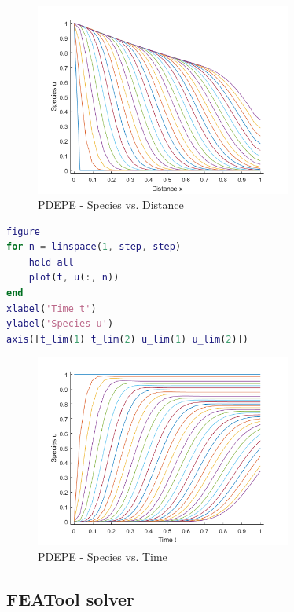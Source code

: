 \documentclass{article}
\begin{document}
\begin{figure}[h!]
\centering
\includegraphics[width=0.75\textwidth]{./img/PDEPE_Species_vs_Distance.png}
\caption{PDEPE - Species vs. Distance}
\label{fig_PDEPE_Species_vs_Distance}
\end{figure}

\begin{lstlisting}[language=Matlab, caption=PDEPE Time vs. Species plot, label=PDEPE_speciesTimePlot]
figure
for n = linspace(1, step, step)
    hold all
    plot(t, u(:, n))
end
xlabel('Time t')
ylabel('Species u')
axis([t_lim(1) t_lim(2) u_lim(1) u_lim(2)])
\end{lstlisting}

\begin{figure}[h!]
\centering
\includegraphics[width=0.75\textwidth]{./img/PDEPE_Species_vs_Time.png}
\caption{PDEPE - Species vs. Time}
\label{PDEPE_Species_vs_Time}
\end{figure}

\subsection{FEATool solver}
\end{document}
